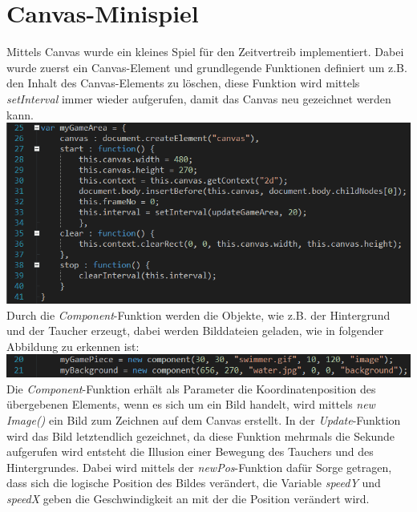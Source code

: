 \section{Canvas-Minispiel}
Mittels Canvas wurde ein kleines Spiel f\"ur den Zeitvertreib implementiert. Dabei wurde zuerst ein Canvas-Element und grundlegende Funktionen definiert um z.B. den Inhalt des Canvas-Elements zu löschen, diese Funktion wird mittels \textit{setInterval} immer wieder aufgerufen, damit das Canvas neu gezeichnet werden kann.     
\newline
\includegraphics[width=1\textwidth]{img/vincent/abb04.png}
\newline
Durch die \textit{Component}-Funktion werden die Objekte, wie z.B. der Hintergrund und der Taucher erzeugt, dabei werden Bilddateien geladen, wie in folgender Abbildung zu erkennen ist: 
\newline
\includegraphics[width=1\textwidth]{img/vincent/abb05.png}
\newline
Die \textit{Component}-Funktion erh\"alt als Parameter die Koordinatenposition des \"ubergebenen Elements, wenn es sich um ein Bild handelt, wird mittels \textit{new Image()} ein Bild zum Zeichnen auf dem Canvas erstellt. In der \textit{Update}-Funktion wird das Bild letztendlich gezeichnet, da diese Funktion mehrmals die Sekunde aufgerufen wird entsteht die Illusion einer Bewegung des Tauchers und des Hintergrundes. Dabei wird mittels der \textit{newPos}-Funktion daf\"ur Sorge getragen, dass sich die logische Position des Bildes ver\"andert, die Variable \textit{speedY} und \textit{speedX} geben die Geschwindigkeit an mit der die Position ver\"andert wird. 
\newline

